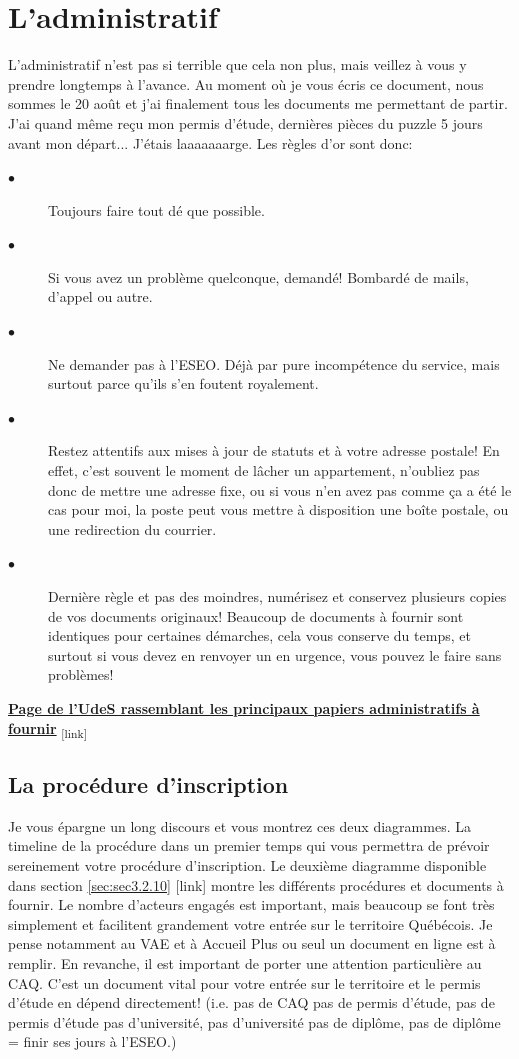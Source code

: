 \section{L'administratif}\label{sec:sec3.2}
L'administratif n'est pas si terrible que cela non plus, mais veillez à vous y prendre longtemps à l'avance. Au moment où je vous écris ce document, nous sommes le 20 août et j'ai finalement tous les documents me permettant de partir. J’ai quand même reçu mon permis d’étude, dernières pièces du puzzle 5 jours avant mon départ... J’étais laaaaaaarge. Les règles d’or sont donc:
\begin{description}
  \item[$\bullet$]Toujours faire tout dé que possible.
  \item[$\bullet$]Si vous avez un problème quelconque, demandé! Bombardé de mails, d'appel ou autre.
  \item[$\bullet$]Ne demander pas à l'ESEO. Déjà par pure incompétence du service, mais surtout parce qu'ils s'en foutent royalement.
  \item[$\bullet$]Restez attentifs aux mises à jour de statuts et à votre adresse postale!
  En effet, c’est souvent le moment de lâcher un appartement, n’oubliez pas donc de mettre une adresse fixe, ou si vous n’en avez pas comme ça a été le cas pour moi, la poste peut vous mettre à disposition une boîte postale, ou une redirection du courrier.
  \item[$\bullet$]Dernière règle et pas des moindres, numérisez et conservez plusieurs copies de vos documents originaux! Beaucoup de documents à fournir sont identiques pour certaines démarches, cela vous conserve du temps, et surtout si vous devez en renvoyer un en urgence, vous pouvez le faire sans problèmes!
\end{description}

\bigbreak
\href{https://www.usherbrooke.ca/etudiants-internationaux/fr/guide-daccueil/avant-votre-arrivee/papiers-legaux/}{\textbf{Page de l'UdeS rassemblant les principaux papiers administratifs à fournir}}\textsubscript{  [link]}

\subsection{La procédure d'inscription}\label{sec:sec3.2.1}
Je vous épargne un long discours et vous montrez ces deux diagrammes. La timeline de la procédure dans un premier temps qui vous permettra de prévoir sereinement votre procédure d'inscription. Le deuxième diagramme disponible dans section \ref{sec:sec3.2.10} [link] montre les différents procédures et documents à fournir. Le nombre d'acteurs engagés est important, mais beaucoup se font très simplement et facilitent grandement votre entrée sur le territoire Québécois. Je pense notamment au VAE et à Accueil Plus ou seul un document en ligne est à remplir.
En revanche, il est important de porter une attention particulière au CAQ. C'est un document vital pour votre entrée sur le territoire et le permis d'étude en dépend directement! (i.e. pas de CAQ pas de permis d'étude, pas de permis d'étude pas d'université, pas d'université pas de diplôme, pas de diplôme = finir ses jours à l'ESEO.)

